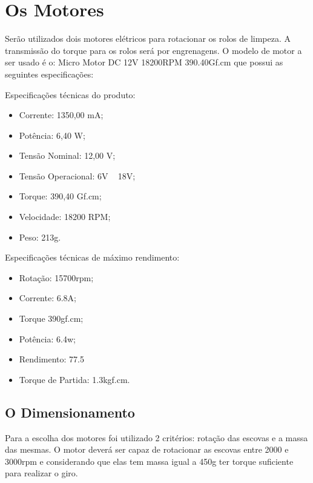 \section{Os Motores}
Serão utilizados dois motores elétricos para rotacionar os rolos de limpeza. A transmissão do torque para os rolos será por engrenagens. O modelo de motor a ser usado é o: \textsf{Micro Motor DC 12V 18200RPM 390.40Gf.cm} que possui as seguintes especificações:

Especificações técnicas do produto:
\begin{itemize}
\item Corrente: 1350,00 mA;
\item Potência: 6,40 W;
\item Tensão Nominal: 12,00 V;
\item Tensão Operacional: 6V ~ 18V;
\item Torque: 390,40 Gf.cm;
\item Velocidade: 18200 RPM;
\item Peso: 213g.
\end{itemize}

Especificações técnicas de máximo rendimento:
\begin{itemize}
\item Rotação: 15700rpm;
\item Corrente: 6.8A;
\item Torque 390gf.cm;
\item Potência: 6.4w;
\item Rendimento: 77.5%
\item Torque de Partida: 1.3kgf.cm.
\end{itemize}

\subsection{O Dimensionamento}
Para a escolha dos motores foi utilizado 2 critérios: rotação das escovas e a massa das mesmas. O motor deverá ser capaz de rotacionar as escovas entre 2000 e 3000rpm e considerando que elas tem massa igual a 450g ter torque suficiente para realizar o giro.
